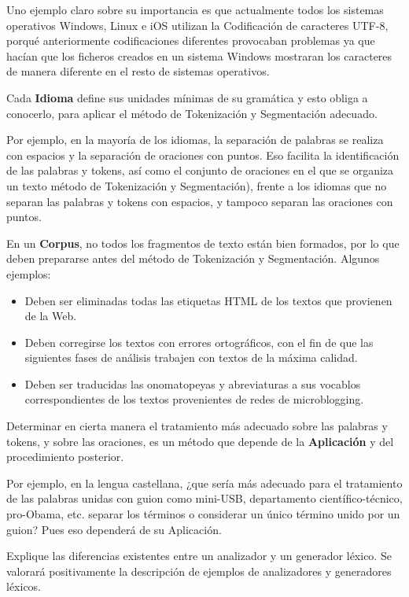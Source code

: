\documentclass[11pt]{exam}
\begin{document}
\begin{questions}
Uno ejemplo claro sobre su importancia es que actualmente todos los sistemas operativos Windows, Linux e iOS utilizan la Codificación de caracteres UTF-8, porqué anteriormente codificaciones diferentes provocaban problemas ya que hacían que los ficheros creados en un sistema Windows mostraran los caracteres de manera diferente en el resto de sistemas operativos. 

Cada {\bf Idioma} define sus unidades mínimas de su gramática y esto obliga a conocerlo, para aplicar el método de Tokenización y Segmentación adecuado.

Por ejemplo, en la mayoría de los idiomas, la separación de palabras se realiza con espacios y la separación de oraciones con puntos. Eso facilita la identificación de las palabras y tokens, así como el conjunto de oraciones en el que se organiza un texto método de Tokenización y Segmentación), frente a los idiomas que no separan las palabras y tokens con espacios, y tampoco separan las oraciones con puntos.

En un {\bf Corpus}, no todos los fragmentos de texto están bien formados, por lo que deben prepararse antes del método de Tokenización y Segmentación. Algunos ejemplos:

\begin{itemize}
	\item Deben ser	eliminadas todas las etiquetas HTML de los textos que provienen de la Web.
	\item Deben corregirse los textos con errores ortográficos, con el fin de que las siguientes fases de análisis trabajen con textos de la máxima calidad.
	\item Deben ser traducidas las onomatopeyas y abreviaturas a sus vocablos correspondientes de los textos provenientes de redes de microblogging. 
\end{itemize}

Determinar en cierta manera el tratamiento más adecuado sobre las palabras y tokens, y sobre las oraciones, es un método que depende de la {\bf Aplicación} y del procedimiento posterior.

Por ejemplo, en la lengua castellana, ¿que sería más adecuado para el tratamiento de las palabras unidas con guion como mini-USB, departamento científico-técnico, pro-Obama, etc. separar los términos o considerar un único término unido por un guion? Pues eso dependerá de su Aplicación.

\question Explique las diferencias existentes entre un analizador y un generador léxico. Se valorará positivamente la descripción de ejemplos de analizadores y generadores léxicos. 


\end{questions}
\end{document}
